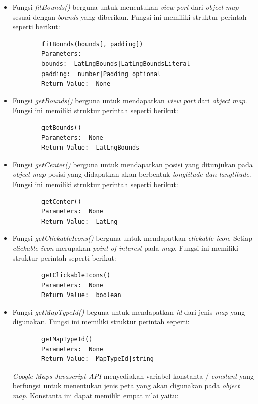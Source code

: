 \begin{itemize}
    \item Fungsi \textit{fitBounds()}  berguna untuk menentukan \textit{view port} dari \textit{object} \textit{map} sesuai dengan \textit{bounds} yang diberikan. Fungsi ini memiliki struktur perintah seperti berikut:
    \begin{lstlisting}
        fitBounds(bounds[, padding])
        Parameters: 
        bounds:  LatLngBounds|LatLngBoundsLiteral
        padding:  number|Padding optional
        Return Value:  None
    \end{lstlisting}
    \item Fungsi \textit{getBounds()}  berguna untuk mendapatkan \textit{view port} dari \textit{object} \textit{map}. Fungsi ini memiliki struktur perintah seperti berikut:
    \begin{lstlisting}
        getBounds()
        Parameters:  None
        Return Value:  LatLngBounds
    \end{lstlisting}
    \item Fungsi \textit{getCenter()}  berguna untuk mendapatkan posisi yang ditunjukan pada \textit{object} \textit{map} posisi yang didapatkan akan berbentuk \textit{longtitude dan langtitude}. Fungsi ini memiliki struktur perintah seperti berikut:
    \begin{lstlisting}
        getCenter()
        Parameters:  None
        Return Value:  LatLng
    \end{lstlisting}
    \item Fungsi \textit{getClickableIcons()} berguna untuk mendapatkan \textit{clickable icon}. Setiap \textit{clickable icon} merupakan \textit{point of interest} pada \textit{map}. Fungsi ini memiliki struktur perintah seperti berikut:
    \begin{lstlisting}
        getClickableIcons()
        Parameters:  None
        Return Value:  boolean
    \end{lstlisting}
    \item Fungsi \textit{getMapTypeId()} beguna untuk mendapatkan \textit{id} dari jenis \textit{map} yang digunakan. Fungsi ini memiliki struktur perintah seperti:
    \begin{lstlisting}
        getMapTypeId()
        Parameters:  None
        Return Value:  MapTypeId|string
    \end{lstlisting}
    \textit{Google Maps Javascript API} menyediakan variabel konstanta / \textit{constant} yang berfungsi untuk menentukan jenis peta yang akan digunakan pada \textit{object} \textit{map}. Konstanta ini dapat memiliki empat nilai yaitu:

\end{itemize}

